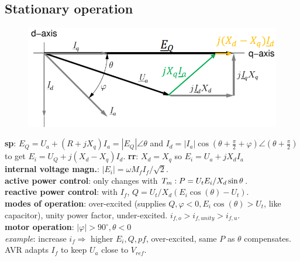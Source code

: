 \documentclass[a4paper,10pt,landscape]{scrartcl}
\begin{document}
\begin{multicols*}{3}
\subsection{Stationary operation}
\begin{figure}
    \centering
    \includegraphics[width=\linewidth]{src/sp phasor diagram.png}
\end{figure}
\textbf{sp}: $E_Q=U_a+(R+jX_q)I_a=|E_Q|\angle\theta$ and $I_d=|I_a|\cos(\theta+\frac{\pi}{2}+\varphi)\angle(\theta+\frac{\pi}{2})$ to get $E_i=U_Q+j(X_d-X_q)I_d$. \textbf{rr}: $X_d=X_q$ so $E_i=U_a+jX_dI_a$ \\
\textbf{internal voltage magn.}: $|E_i|=\omega M_fI_f/\sqrt{2}$. \\
\textbf{active power control}: only changes with $T_m: \\ P=U_tE_i/X_d\sin\theta$. \\
\textbf{reactive power control}: with $I_f$, $Q=U_t/X_d(E_i\cos(\theta) - U_t)$. \\
\textbf{modes of operation}: over-excited (supplies $Q,\varphi<0, E_i\cos(\theta)>U_t$, like capacitor), unity power factor, under-excited. $i_{f,o}>i_{f,unity}>i_{f,u}$. \\
\textbf{motor operation}: $|\varphi|>90^\circ,\theta<0$ \\
\textit{example}: increase $i_f\Rightarrow$ higher $E_i, Q, pf$, over-excited, same $P$ as $\theta$ compensates. AVR adapts $I_f$ to keep $U_a$ close to $V_{ref}$.


\end{multicols*}
\end{document}
